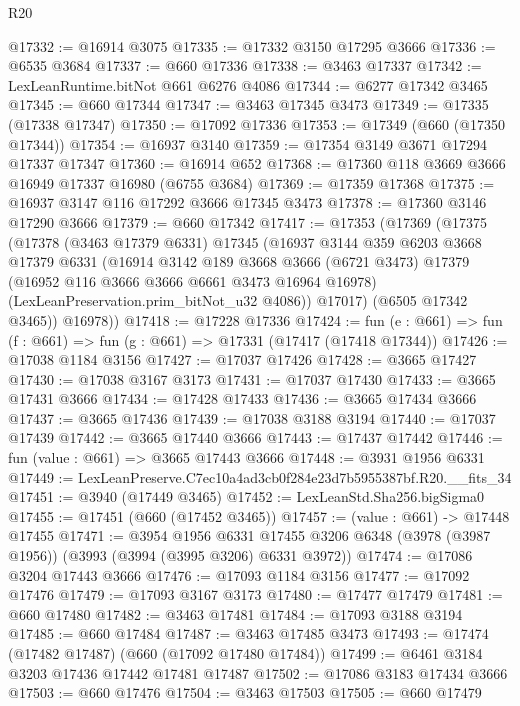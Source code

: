 \begin{lexlean}{R20}
\begin{coremodule}
@17332 := @16914 @3075
@17335 := @17332 @3150 @17295 @3666
@17336 := @6535 @3684
@17337 := @660 @17336
@17338 := @3463 @17337
@17342 := LexLeanRuntime.bitNot @661 @6276 @4086
@17344 := @6277 @17342 @3465
@17345 := @660 @17344
@17347 := @3463 @17345 @3473
@17349 := @17335 (@17338 @17347)
@17350 := @17092 @17336
@17353 := @17349 (@660 (@17350 @17344))
@17354 := @16937 @3140
@17359 := @17354 @3149 @3671 @17294 @17337 @17347
@17360 := @16914 @652
@17368 := @17360 @118 @3669 @3666 @16949 @17337 @16980 (@6755 @3684)
@17369 := @17359 @17368
@17375 := @16937 @3147 @116 @17292 @3666 @17345 @3473
@17378 := @17360 @3146 @17290 @3666
@17379 := @660 @17342
@17417 := @17353
    (@17369
      (@17375
        (@17378
          (@3463 @17379 @6331)
          @17345
          (@16937
            @3144
            @359
            @6203
            @3668
            @17379
            @6331
            (@16914
              @3142
              @189
              @3668
              @3666
              (@6721 @3473)
              @17379
              (@16952 @116 @3666 @3666 @6661 @3473 @16964 @16978)
              (LexLeanPreservation.prim_bitNot_u32 @4086))
            @17017)
          (@6505 @17342 @3465))
        @16978))
@17418 := @17228 @17336
@17424 := fun (e : @661) => fun (f : @661) => fun (g : @661) => @17331 (@17417 (@17418 @17344))
@17426 := @17038 @1184 @3156
@17427 := @17037 @17426
@17428 := @3665 @17427
@17430 := @17038 @3167 @3173
@17431 := @17037 @17430
@17433 := @3665 @17431 @3666
@17434 := @17428 @17433
@17436 := @3665 @17434 @3666
@17437 := @3665 @17436
@17439 := @17038 @3188 @3194
@17440 := @17037 @17439
@17442 := @3665 @17440 @3666
@17443 := @17437 @17442
@17446 := fun (value : @661) => @3665 @17443 @3666
@17448 := @3931 @1956 @6331
@17449 := LexLeanPreserve.C7ec10a4ad3cb0f284e23d7b5955387bf.R20.__fits_34
@17451 := @3940 (@17449 @3465)
@17452 := LexLeanStd.Sha256.bigSigma0
@17455 := @17451 (@660 (@17452 @3465))
@17457 := (value : @661) -> @17448 @17455
@17471 := @3954
    @1956
    @6331
    @17455
    @3206
    @6348
    (@3978 (@3987 @1956))
    (@3993 (@3994 (@3995 @3206) @6331 @3972))
@17474 := @17086 @3204 @17443 @3666
@17476 := @17093 @1184 @3156
@17477 := @17092 @17476
@17479 := @17093 @3167 @3173
@17480 := @17477 @17479
@17481 := @660 @17480
@17482 := @3463 @17481
@17484 := @17093 @3188 @3194
@17485 := @660 @17484
@17487 := @3463 @17485 @3473
@17493 := @17474 (@17482 @17487) (@660 (@17092 @17480 @17484))
@17499 := @6461 @3184 @3203 @17436 @17442 @17481 @17487
@17502 := @17086 @3183 @17434 @3666
@17503 := @660 @17476
@17504 := @3463 @17503
@17505 := @660 @17479

\end{coremodule}
\end{lexlean}
